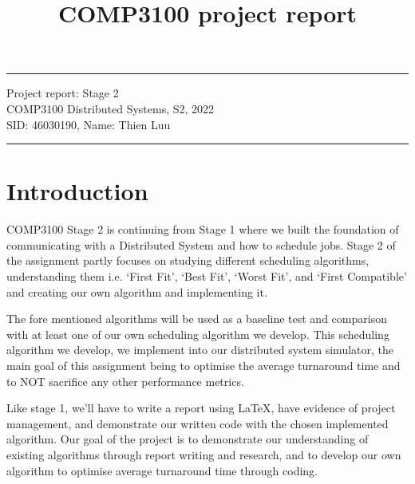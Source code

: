 \documentclass[a4paper]{article} %
\begin{document}

\title{COMP3100 project report} %
\fancyhead[C]{}
\hrule \medskip %
\begin{minipage}{1\textwidth} %
\centering 
\large %
Project report: Stage 2\\ %
COMP3100 Distributed Systems, S2, 2022\\
\normalsize %
SID: 46030190, Name: Thien Luu \cite{code}
\end{minipage}
\medskip\hrule %
\bigskip



\section{Introduction}
COMP3100 Stage 2 is continuing from Stage 1 where we built the foundation of communicating with a Distributed System and how to schedule jobs. Stage 2 of the assignment partly focuses on studying different scheduling algorithms, understanding them i.e. ‘First Fit’, ‘Best Fit’, ‘Worst Fit’, and ‘First Compatible’ and creating our own algorithm and implementing it.
\bigskip

The fore mentioned algorithms will be used as a baseline test and comparison with at least one of our own scheduling algorithm we develop. This scheduling algorithm we develop, we implement into our distributed system simulator, the main goal of this assignment being to optimise the average turnaround time and to NOT sacrifice any other performance metrics.
\bigskip

Like stage 1, we’ll have to write a report using \LaTeX, have evidence of project management, and demonstrate our written code with the chosen implemented algorithm.
Our goal of the project is to demonstrate our understanding of existing algorithms through report writing and research, and to develop our own algorithm to optimise average turnaround time through coding.
\end{document}
